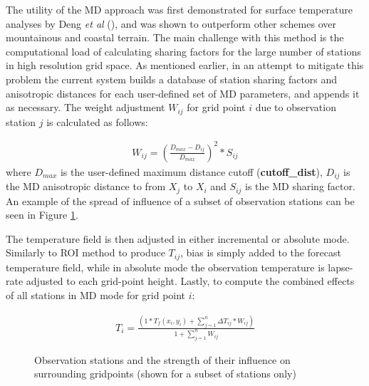 \documentclass{article}
\begin{document}
The utility of the MD approach was first demonstrated for surface temperature analyses by Deng \emph{et al} (\cite{Deng2005}), and was shown to outperform other schemes over mountainous and coastal terrain. The main challenge with this method is the computational load of calculating sharing factors for the large number of stations in high resolution grid space. As mentioned earlier, in an attempt to mitigate this problem the current system builds a database of station sharing factors and anisotropic distances for each user-defined set of MD parameters, and appends it as necessary. The weight adjustment $W_{ij}$ for grid point $i$ due to observation station $j$ is calculated as follows:

\begin{eqnarray}
W_{ij} = (\frac{D_{max} - D_{ij}}{D_{max}})^2 * S_{ij}
\end{eqnarray}
where $D_{max}$ is the user-defined maximum distance cutoff (\textbf{cutoff\_dist}), $D_{ij}$ is the MD anisotropic distance to from $X_j$ to $X_i$ and $S_{ij}$ is the MD sharing factor. An example of the spread of influence of a subset of observation stations can be seen in Figure \ref{fig:MD}.

The temperature field is then adjusted in either incremental or absolute mode. Similarly to ROI method to produce $T_{ij}$, bias is simply added to the forecast temperature field, while in absolute mode the observation temperature is lapse-rate adjusted to each grid-point height. Lastly, to compute the combined effects of all stations in MD mode for grid point $i$:

\begin{eqnarray}
T_i = \frac{(1 * T_f(x_i,y_i) + \sum\limits_{j=1}^n \Delta T_{ij} * W_{ij})}{1 + \sum\limits_{j=1}^n W_{ij}}
\end{eqnarray}

\begin{landscape}
\pagestyle{empty}

\begin{figure}
\caption{Observation stations and the strength of their influence on surrounding gridpoints	 (shown for a subset of stations only)}\label{fig:MD} 
\end{figure}

\end{landscape}
\restoregeometry
\pagestyle{plain}
\end{document}
